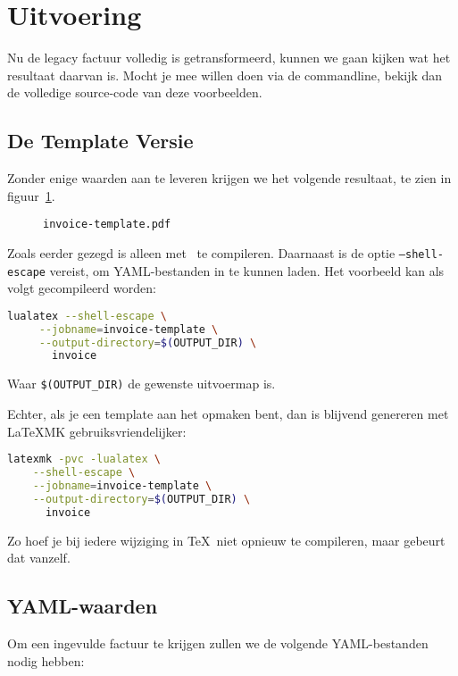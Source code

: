 \section{Uitvoering}\label{sec:output}
Nu de legacy factuur volledig is getransformeerd, kunnen we gaan kijken wat het resultaat daarvan is.
Mocht je mee willen doen via de commandline, bekijk dan de volledige source-code\cite{ginvoice-template} van deze voorbeelden.

\subsection{De Template Versie}
Zonder enige waarden aan te leveren krijgen we het volgende resultaat, te zien in figuur~\ref{fig:template}.\\
\setlength\fboxsep{0pt}%
\begin{figure}[!ht]%
    \caption{\texttt{invoice-template.pdf}}\label{fig:template}%
\end{figure}
Zoals eerder gezegd is  alleen met \LuaLaTeX\ te compileren.
Daarnaast is de optie \texttt{--shell-escape} vereist, om YAML-bestanden in te kunnen laden.
Het voorbeeld kan als volgt gecompileerd worden:
\begin{lstlisting}[language=bash,caption={Compileren met \texttt{lualatex}}]
lualatex --shell-escape \
     --jobname=invoice-template \
     --output-directory=$(OUTPUT_DIR) \
       invoice
\end{lstlisting}
Waar \texttt{\$(OUTPUT\_DIR)} de gewenste uitvoermap is.

Echter, als je een template aan het opmaken bent, dan is blijvend genereren met \LaTeX MK gebruiksvriendelijker:
\begin{lstlisting}[language=bash,caption={Compileren met \texttt{latexmk}}]
latexmk -pvc -lualatex \
    --shell-escape \
    --jobname=invoice-template \
    --output-directory=$(OUTPUT_DIR) \
      invoice
\end{lstlisting}
Zo hoef je bij iedere wijziging in \TeX\ niet opnieuw te compileren, maar gebeurt dat vanzelf.

\subsection{YAML-waarden}
Om een ingevulde factuur te krijgen zullen we de volgende YAML-bestanden nodig hebben:


